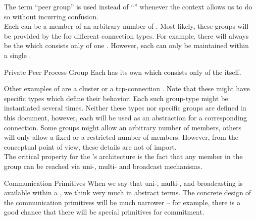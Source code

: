 \documentclass[a4paper, 12pt]{book}
\begin{document}
%
The term ``peer group'' is used instead of ``''
whenever the context allows us to do so without incurring confusion.\\
%
Each  can be a member of an arbitrary number of . Most likely, these groups will be provided by the
\SYNEIGHT for different connection types. For example, there
will always be the  which consists only
of one .
%
However, each  can only be maintained within a single
. 
%
\begin{definition*}{Private Peer Process Group}
  Each  has its own  which
  consists only of the  itself.
\end{definition*}
%
Other examples of  are a cluster  or a tcp-connection . Note that
these  might have specific types which define their
behavior. Each such group-type might be instantiated several times.
%
%
Neither these types nor specific groups are defined in this document,
however, each  will be used as an abstraction
for a corresponding connection. 
%
Some groups might allow an arbitrary number of members, others will
only allow a fixed or a restricted number of members. However, from the
conceptual point of view, these details are not of import.\\
%
The critical property for the \SYNEIGHT's architecture is the
fact that any member in the group can be reached via uni-, multi- and
broadcast mechanisms. 
%
\begin{remark*}{Communication Primitives}
  When we say that uni-, multi-, and broadcasting is available within
  a , we think very much in abstract terms. The
  concrete design of the communication primitives will be much
  narrower -- for example, there is a good chance that there will be
  special primitives for commitment. 
\end{remark*}
\end{document}
